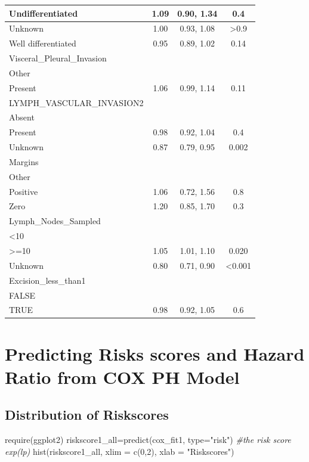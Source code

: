 \documentclass[
  11pt,
]{article}
\newenvironment{Shaded}{\begin{snugshade}}{\end{snugshade}}
\newcommand{\AttributeTok}[1]{\textcolor[rgb]{0.77,0.63,0.00}{#1}}
\newcommand{\CommentTok}[1]{\textcolor[rgb]{0.56,0.35,0.01}{\textit{#1}}}
\newcommand{\DecValTok}[1]{\textcolor[rgb]{0.00,0.00,0.81}{#1}}
\newcommand{\FunctionTok}[1]{\textcolor[rgb]{0.00,0.00,0.00}{#1}}
\newcommand{\NormalTok}[1]{#1}
\newcommand{\OtherTok}[1]{\textcolor[rgb]{0.56,0.35,0.01}{#1}}
\newcommand{\StringTok}[1]{\textcolor[rgb]{0.31,0.60,0.02}{#1}}
\begin{document}
\begin{tabular}{l|c|c|c}
\hline
Undifferentiated & 1.09 & 0.90, 1.34 & 0.4\\
\hline
Unknown & 1.00 & 0.93, 1.08 & >0.9\\
\hline
Well differentiated & 0.95 & 0.89, 1.02 & 0.14\\
\hline
Visceral\_Pleural\_Invasion &  &  & \\
\hline
Other &  &  & \\
\hline
Present & 1.06 & 0.99, 1.14 & 0.11\\
\hline
LYMPH\_VASCULAR\_INVASION2 &  &  & \\
\hline
Absent &  &  & \\
\hline
Present & 0.98 & 0.92, 1.04 & 0.4\\
\hline
Unknown & 0.87 & 0.79, 0.95 & 0.002\\
\hline
Margins &  &  & \\
\hline
Other &  &  & \\
\hline
Positive & 1.06 & 0.72, 1.56 & 0.8\\
\hline
Zero & 1.20 & 0.85, 1.70 & 0.3\\
\hline
Lymph\_Nodes\_Sampled &  &  & \\
\hline
<10 &  &  & \\
\hline
>=10 & 1.05 & 1.01, 1.10 & 0.020\\
\hline
Unknown & 0.80 & 0.71, 0.90 & <0.001\\
\hline
Excision\_less\_than1 &  &  & \\
\hline
FALSE &  &  & \\
\hline
TRUE & 0.98 & 0.92, 1.05 & 0.6\\
\hline
\end{tabular}

\newpage
\section{Predicting Risks scores and Hazard Ratio from COX PH Model}
\subsection{Distribution of Riskscores}

\begin{Shaded}
\begin{Highlighting}[]
\FunctionTok{require}\NormalTok{(ggplot2)}
\NormalTok{riskscore1\_all}\OtherTok{=}\FunctionTok{predict}\NormalTok{(cox\_fit1,  }\AttributeTok{type=}\StringTok{"risk"}\NormalTok{) }\CommentTok{\#the risk score exp(lp)}
\FunctionTok{hist}\NormalTok{(riskscore1\_all, }\AttributeTok{xlim =} \FunctionTok{c}\NormalTok{(}\DecValTok{0}\NormalTok{,}\DecValTok{2}\NormalTok{), }\AttributeTok{xlab =} \StringTok{"Riskscores"}\NormalTok{)}
\end{Highlighting}
\end{Shaded}
\end{document}
